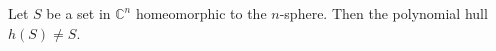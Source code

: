 
Let $S$ be a set in $\mathbb{C}^n$ homeomorphic to the $n$-sphere. Then the polynomial hull $h(S) \neq S$.
